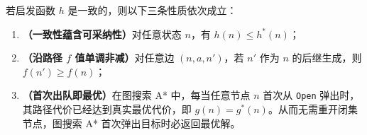 \begin{thmBox}
\begin{theorem}\label{thm:astar-graph}
若启发函数 $h$ 是一致的，则以下三条性质依次成立：
\begin{enumerate}
  \item \textbf{（一致性蕴含可采纳性）}对任意状态 $n$，有 $h(n) \le h^*(n)$；
  \item \textbf{（沿路径 $f$ 值单调非减）}对任意边 $(n, a, n')$，若 $n'$ 作为 $n$ 的后继生成，则 $f(n') \ge f(n)$；
  \item \textbf{（首次出队即最优）}在图搜索 A* 中，每当任意节点 $n$ 首次从 \texttt{Open} 弹出时，其路径代价已经达到真实最优代价，即 $g(n) = g^*(n)$。从而无需重开闭集节点，图搜索 A* 首次弹出目标时必返回最优解。
\end{enumerate}
\end{theorem}
\end{thmBox}


